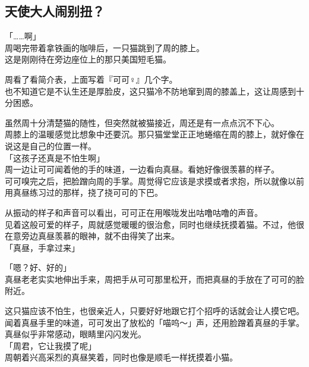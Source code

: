 \subsection{天使大人闹别扭？}

「……啊」\\

周喝完带着拿铁画的咖啡后，一只猫跳到了周的膝上。\\

这是刚刚待在旁边座位上的那只美国短毛猫。

周看了看简介表，上面写着『可可♀』几个字。\\

也不知道它是不认生还是厚脸皮，这只猫冷不防地窜到周的膝盖上，这让周感到十分困惑。

虽然周十分清楚猫的随性，但突然就被猫接近，周还是有一点点沉不下心。\\

周膝上的温暖感觉比想象中还要沉。那只猫堂堂正正地蜷缩在周的膝上，就好像在说这是自己的位置一样。\\

「这孩子还真是不怕生啊」\\

周一边让可可闻着他的手的味道，一边看向真昼。看她好像很羡慕的样子。\\

可可嗅完之后，把脸蹭向周的手掌。周觉得它应该是求摸或者求抱，所以就像以前用真昼练习过的那样，挠了挠可可的下巴。

从振动的样子和声音可以看出，可可正在用喉咙发出咕噜咕噜的声音。\\

见着这般可爱的样子，周就感觉暖暖的很治愈，同时也继续抚摸着猫。不过，他很在意旁边真昼羡慕的眼神，就不由得笑了出来。\\

「真昼，手拿过来」

「嗯？好、好的」\\

真昼老老实实地伸出手来，周把手从可可那里松开，而把真昼的手放在了可可的脸附近。

这只猫应该不怕生，也很亲近人，只要好好地跟它打个招呼的话就会让人摸它吧。\\

闻着真昼手里的味道，可可发出了放松的「喵呜～」声，还用脸蹭着真昼的手掌。真昼似乎非常感动，眼睛里闪闪发光。\\

「周君，它让我摸了呢」\\

周朝着兴高采烈的真昼笑着，同时也像是顺毛一样抚摸着小猫。

